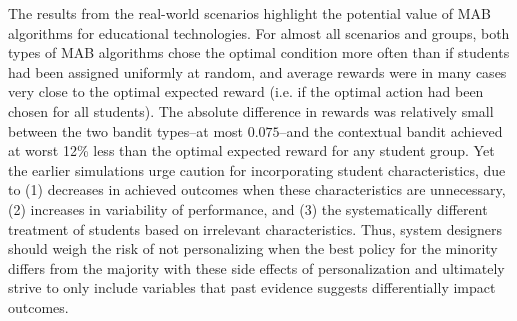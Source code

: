 The results from the real-world scenarios highlight the potential value of MAB algorithms for educational technologies. For almost all scenarios and groups, both types of MAB algorithms chose the optimal condition more often than if students had been assigned uniformly at random, and average rewards were in many cases very close to the optimal expected reward (i.e. if the optimal action had been chosen for all students). The absolute difference in rewards was relatively small between the two bandit types--at most $0.075$--and the contextual bandit achieved at worst 12\% less than the optimal expected reward for any student group. Yet the earlier simulations urge caution for incorporating student characteristics, due to (1) decreases in achieved outcomes when these characteristics are unnecessary, (2) increases in variability of performance, and (3) the systematically different treatment of students based on irrelevant characteristics. Thus, system designers should weigh the risk of not personalizing when the best policy for the minority differs from the majority with these side effects of personalization and ultimately strive to only include variables that past evidence suggests differentially impact outcomes.


